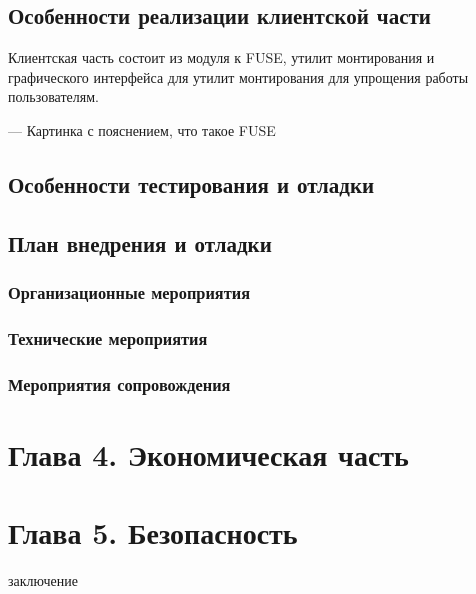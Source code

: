 \documentclass[utf8,usehyperref,12pt]{G7-32}
\begin{document}
\section{Особенности реализации клиентской части}
Клиентская часть состоит из модуля к FUSE, утилит монтирования и графического интерфейса для утилит монтирования для упрощения работы пользователям. 

--- Картинка с пояснением, что такое FUSE
\section{Особенности тестирования и отладки}
\section{План внедрения и отладки}
\subsection{Организационные мероприятия}
\subsection{Технические мероприятия}
\subsection{Мероприятия сопровождения}

\chapter{Глава 4. Экономическая часть}
\chapter{Глава 5. Безопасность}

\Conclusion
заключение
\end{document}
